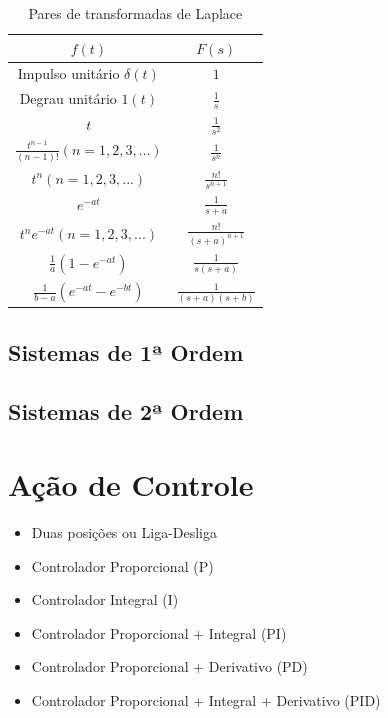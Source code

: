 \begin{table}[h]
\centering
\caption{Pares de transformadas de Laplace}
\label{tab:Laplace}
\begin{tabular}{c|c}
\hline
$f(t)$ & $F(s)$ \\
\hline
\hline
Impulso unitário $\delta(t)$ 		& $1$ 			\\ \hline
Degrau unitário $1(t)$ 			& $\frac{1}{s}$		\\ \hline
$t$ 					& $\frac{1}{s^2}$ 	\\ \hline
$\frac{t^{n-1}}{(n-1)!} (n=1,2,3,...)$ 	& $\frac{1}{s^n}$ 	\\ \hline
$t^n (n=1,2,3,...)$ 			& $\frac{n!}{s^{n+1}}$ 	\\ \hline
$e^{-at}$ 				& $\frac{1}{s+a}$ 	\\ \hline
$t^n e^{-at} (n=1,2,3,...)$ 		& $\frac{n!}{(s+a)^{n+1}}$ \\\hline
$\frac{1}{a} (1-e^{-at})$ 		& $\frac{1}{s(s+a)}$ 	\\ \hline
$\frac{1}{b-a}(e^{-at}-e^{-bt})$ 	& $\frac{1}{(s+a)(s+b)}$ \\ \hline
\end{tabular}
\end{table}



\subsection{Sistemas de 1ª Ordem}



\subsection{Sistemas de 2ª Ordem}



\section{Ação de Controle}

\begin{itemize}
	\item Duas posições ou Liga-Desliga
	\item Controlador Proporcional (P)
	\item Controlador Integral (I)
	\item Controlador Proporcional + Integral (PI)
	\item Controlador Proporcional + Derivativo (PD)
	\item Controlador Proporcional + Integral + Derivativo (PID)
	
\end{itemize}



